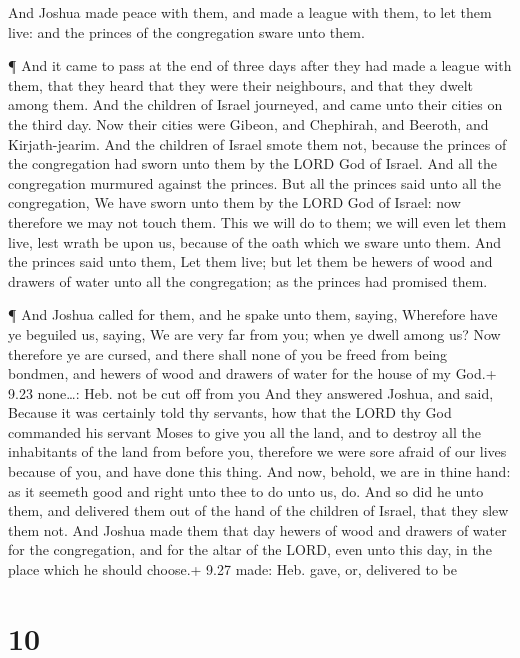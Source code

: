  And Joshua made peace with them, and made a league with
them, to let them live: and the princes of the congregation sware unto
them.

 ¶ And it came to pass at the end of three days after they
had made a league with them, that they heard that they were their
neighbours, and that they dwelt among them.  And the
children of Israel journeyed, and came unto their cities on the third
day. Now their cities were Gibeon, and Chephirah, and Beeroth, and
Kirjath-jearim.  And the children of Israel smote them not,
because the princes of the congregation had sworn unto them by the LORD
God of Israel. And all the congregation murmured against the princes.
 But all the princes said unto all the congregation, We
have sworn unto them by the LORD God of Israel: now therefore we may not
touch them.  This we will do to them; we will even let them
live, lest wrath be upon us, because of the oath which we sware unto
them.  And the princes said unto them, Let them live; but
let them be hewers of wood and drawers of water unto all the
congregation; as the princes had promised them.

 ¶ And Joshua called for them, and he spake unto them,
saying, Wherefore have ye beguiled us, saying, We are very far from you;
when ye dwell among us?  Now therefore ye are cursed, and
there shall none of you be freed from being bondmen, and hewers of wood
and drawers of water for the house of my God.+ 9.23 none\ldots: Heb. not
be cut off from you  And they answered Joshua, and said,
Because it was certainly told thy servants, how that the LORD thy God
commanded his servant Moses to give you all the land, and to destroy all
the inhabitants of the land from before you, therefore we were sore
afraid of our lives because of you, and have done this thing.
 And now, behold, we are in thine hand: as it seemeth good
and right unto thee to do unto us, do.  And so did he unto
them, and delivered them out of the hand of the children of Israel, that
they slew them not.  And Joshua made them that day hewers
of wood and drawers of water for the congregation, and for the altar of
the LORD, even unto this day, in the place which he should choose.+ 9.27
made: Heb. gave, or, delivered to be

\hypertarget{section-9}{%
\section{10}\label{section-9}}

